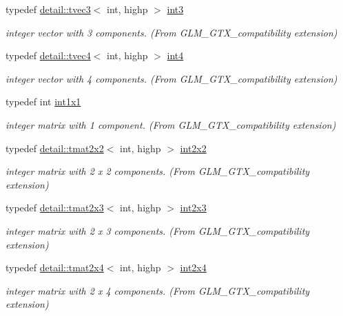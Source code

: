 \begin{DoxyCompactItemize}
typedef \hyperlink{structglm_1_1detail_1_1tvec3}{detail\+::tvec3}$<$ int, highp $>$ \hyperlink{group__gtx__compatibility_gac305b0da08fad90d91854569679c935e}{int3}
\begin{DoxyCompactList}\small\item\em integer vector with 3 components. (From G\+L\+M\+\_\+\+G\+T\+X\+\_\+compatibility extension) \end{DoxyCompactList}\item 
typedef \hyperlink{structglm_1_1detail_1_1tvec4}{detail\+::tvec4}$<$ int, highp $>$ \hyperlink{group__gtx__compatibility_ga9f621a690aa1c2918a9a8a684376b562}{int4}
\begin{DoxyCompactList}\small\item\em integer vector with 4 components. (From G\+L\+M\+\_\+\+G\+T\+X\+\_\+compatibility extension) \end{DoxyCompactList}\item 
typedef int \hyperlink{group__gtx__compatibility_ga09016a637a3cd093c22e6188080ac750}{int1x1}
\begin{DoxyCompactList}\small\item\em integer matrix with 1 component. (From G\+L\+M\+\_\+\+G\+T\+X\+\_\+compatibility extension) \end{DoxyCompactList}\item 
typedef \hyperlink{structglm_1_1detail_1_1tmat2x2}{detail\+::tmat2x2}$<$ int, highp $>$ \hyperlink{group__gtx__compatibility_ga7762d2b809aab75003e7e7873ca74a2f}{int2x2}
\begin{DoxyCompactList}\small\item\em integer matrix with 2 x 2 components. (From G\+L\+M\+\_\+\+G\+T\+X\+\_\+compatibility extension) \end{DoxyCompactList}\item 
typedef \hyperlink{structglm_1_1detail_1_1tmat2x3}{detail\+::tmat2x3}$<$ int, highp $>$ \hyperlink{group__gtx__compatibility_ga42c3d6e4924de559104b9ca2b127c9ac}{int2x3}
\begin{DoxyCompactList}\small\item\em integer matrix with 2 x 3 components. (From G\+L\+M\+\_\+\+G\+T\+X\+\_\+compatibility extension) \end{DoxyCompactList}\item 
typedef \hyperlink{structglm_1_1detail_1_1tmat2x4}{detail\+::tmat2x4}$<$ int, highp $>$ \hyperlink{group__gtx__compatibility_ga145a388c0d988490d6ce901a664faf50}{int2x4}
\begin{DoxyCompactList}\small\item\em integer matrix with 2 x 4 components. (From G\+L\+M\+\_\+\+G\+T\+X\+\_\+compatibility extension) \end{DoxyCompactList}\item 

\end{DoxyCompactItemize}
